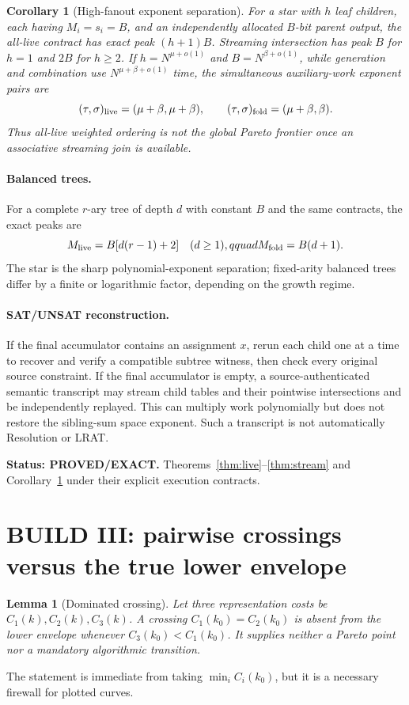 \documentclass[11pt]{article}
\newtheorem{corollary}[theorem]{Corollary}
\newtheorem{lemma}[theorem]{Lemma}
\newcommand{\Status}[1]{\textbf{Status: #1.}}
\begin{document}
\begin{corollary}[High-fanout exponent separation]
\label{cor:star}
For a star with $h$ leaf children, each having $M_i=s_i=B$, and an independently allocated $B$-bit
parent output, the all-live contract has exact peak $(h+1)B$.  Streaming intersection has peak $B$ for
$h=1$ and $2B$ for $h\ge2$.  If
$h=N^{\mu+o(1)}$ and $B=N^{\beta+o(1)}$, while generation and combination use
$N^{\mu+\beta+o(1)}$ time, the simultaneous auxiliary-work exponent pairs are
\[
 (\tau,\sigma)_{\rm live}=(\mu+\beta,\mu+\beta),\qquad
 (\tau,\sigma)_{\rm fold}=(\mu+\beta,\beta).
\]
Thus all-live weighted ordering is not the global Pareto frontier once an associative streaming join
is available.
\end{corollary}

\paragraph{Balanced trees.}
For a complete $r$-ary tree of depth $d$ with constant $B$ and the same contracts, the exact peaks are
\[
 M_{\rm live}=B[d(r-1)+2]\quad(d\ge1),qquad
 M_{\rm fold}=B(d+1).
\]
The star is the sharp polynomial-exponent separation; fixed-arity balanced trees differ by a finite
or logarithmic factor, depending on the growth regime.

\paragraph{SAT/UNSAT reconstruction.}
If the final accumulator contains an assignment $x$, rerun each child one at a time to recover and
verify a compatible subtree witness, then check every original source constraint.  If the final
accumulator is empty, a source-authenticated semantic transcript may stream child tables and their
pointwise intersections and be independently replayed.  This can multiply work polynomially but does
not restore the sibling-sum space exponent.  Such a transcript is not automatically Resolution or
LRAT.

\Status{PROVED/EXACT} Theorems~\ref{thm:live}--\ref{thm:stream} and
Corollary~\ref{cor:star} under their explicit execution contracts.

\section{BUILD III: pairwise crossings versus the true lower envelope}

\begin{lemma}[Dominated crossing]
Let three representation costs be $C_1(k),C_2(k),C_3(k)$.  A crossing
$C_1(k_0)=C_2(k_0)$ is absent from the lower envelope whenever
$C_3(k_0)<C_1(k_0)$.  It supplies neither a Pareto point nor a mandatory algorithmic transition.
\end{lemma}
The statement is immediate from taking $\min_i C_i(k_0)$, but it is a necessary firewall for plotted
curves.
\end{document}
